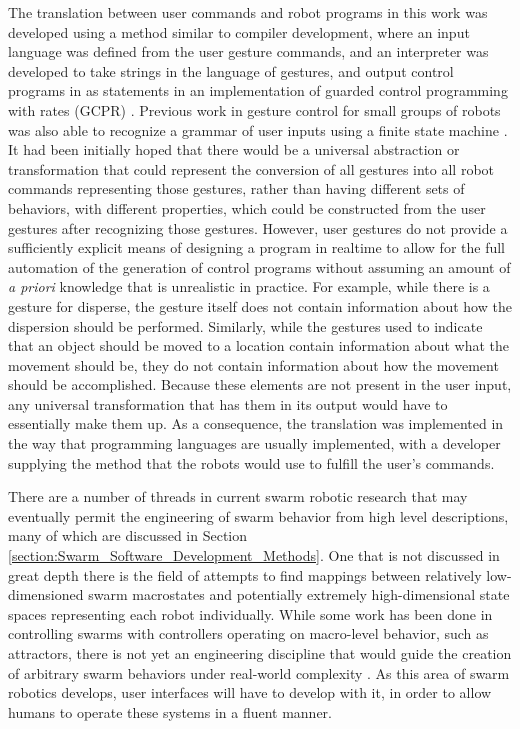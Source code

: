 The translation between user commands and robot programs in this work was developed using a method similar to compiler development, where an input language was defined from the user gesture commands, and an interpreter was developed to take strings in the language of gestures, and output control programs in as statements in an implementation of guarded control programming with rates (GCPR) \citep{napp2011compositional}.  
Previous work in gesture control for small groups of robots was also able to recognize a grammar of user inputs using a finite state machine \citep{micire2010multi}.
It had been initially hoped that there would be a universal abstraction or transformation that could represent the conversion of all gestures into all robot commands representing those gestures, rather than having different sets of behaviors, with different properties, which could be constructed from the user gestures after recognizing those gestures. 
However, user gestures do not provide a sufficiently explicit means of designing a program in realtime to allow for the full automation of the generation of control programs without assuming an amount of \emph{a priori} knowledge that is unrealistic in practice. 
For example, while there is a gesture for disperse, the gesture itself does not contain information about how the dispersion should be performed. 
Similarly, while the gestures used to indicate that an object should be moved to a location contain information about what the movement should be, they do not contain information about how the movement should be accomplished. 
Because these elements are not present in the user input, any universal transformation that has them in its output would have to essentially make them up. 
As a consequence, the translation was implemented in the way that programming languages are usually implemented, with a developer supplying the method that the robots would use to fulfill the user's commands. 

There are a number of threads in current swarm robotic research that may eventually permit the engineering of swarm behavior from high level descriptions, many of which are discussed in Section \ref{section:Swarm_Software_Development_Methods}. 
One that is not discussed in great depth there is the field of attempts to find mappings between relatively low-dimensioned swarm macrostates and potentially extremely high-dimensional state spaces representing each robot individually. 
While some work has been done in controlling swarms with controllers operating on macro-level behavior, such as attractors, there is not yet an engineering discipline that would guide the creation of arbitrary swarm behaviors under real-world complexity \citep{brown2014human}. 
As this area of swarm robotics develops, user interfaces will have to develop with it, in order to allow humans to operate these systems in a fluent manner. 